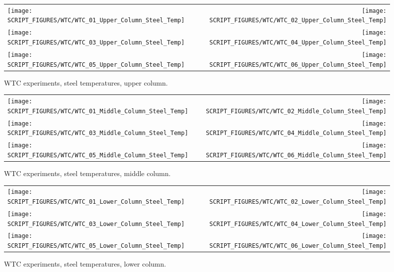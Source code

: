 \begin{figure}[p]
\begin{tabular*}{\textwidth}{l@{\extracolsep{\fill}}r}
\texttt{[image: SCRIPT\_FIGURES/WTC/WTC\_01\_Upper\_Column\_Steel\_Temp]} &
\texttt{[image: SCRIPT\_FIGURES/WTC/WTC\_02\_Upper\_Column\_Steel\_Temp]} \\
\texttt{[image: SCRIPT\_FIGURES/WTC/WTC\_03\_Upper\_Column\_Steel\_Temp]} &
\texttt{[image: SCRIPT\_FIGURES/WTC/WTC\_04\_Upper\_Column\_Steel\_Temp]} \\
\texttt{[image: SCRIPT\_FIGURES/WTC/WTC\_05\_Upper\_Column\_Steel\_Temp]} &
\texttt{[image: SCRIPT\_FIGURES/WTC/WTC\_06\_Upper\_Column\_Steel\_Temp]}
\end{tabular*}
\caption[WTC experiments, steel temperatures, upper column]{WTC experiments, steel temperatures, upper column.}
\label{NIST_WTC_Upper_Column_Steel}
\end{figure}

\begin{figure}[p]
\begin{tabular*}{\textwidth}{l@{\extracolsep{\fill}}r}
\texttt{[image: SCRIPT\_FIGURES/WTC/WTC\_01\_Middle\_Column\_Steel\_Temp]} &
\texttt{[image: SCRIPT\_FIGURES/WTC/WTC\_02\_Middle\_Column\_Steel\_Temp]} \\
\texttt{[image: SCRIPT\_FIGURES/WTC/WTC\_03\_Middle\_Column\_Steel\_Temp]} &
\texttt{[image: SCRIPT\_FIGURES/WTC/WTC\_04\_Middle\_Column\_Steel\_Temp]} \\
\texttt{[image: SCRIPT\_FIGURES/WTC/WTC\_05\_Middle\_Column\_Steel\_Temp]} &
\texttt{[image: SCRIPT\_FIGURES/WTC/WTC\_06\_Middle\_Column\_Steel\_Temp]}
\end{tabular*}
\caption[WTC experiments, steel temperatures, middle column]{WTC experiments, steel temperatures, middle column.}
\label{NIST_WTC_Middle_Column_Steel}
\end{figure}

\begin{figure}[p]
\begin{tabular*}{\textwidth}{l@{\extracolsep{\fill}}r}
\texttt{[image: SCRIPT\_FIGURES/WTC/WTC\_01\_Lower\_Column\_Steel\_Temp]} &
\texttt{[image: SCRIPT\_FIGURES/WTC/WTC\_02\_Lower\_Column\_Steel\_Temp]} \\
\texttt{[image: SCRIPT\_FIGURES/WTC/WTC\_03\_Lower\_Column\_Steel\_Temp]} &
\texttt{[image: SCRIPT\_FIGURES/WTC/WTC\_04\_Lower\_Column\_Steel\_Temp]} \\
\texttt{[image: SCRIPT\_FIGURES/WTC/WTC\_05\_Lower\_Column\_Steel\_Temp]} &
\texttt{[image: SCRIPT\_FIGURES/WTC/WTC\_06\_Lower\_Column\_Steel\_Temp]}
\end{tabular*}
\caption[WTC experiments, steel temperatures, lower column]{WTC experiments, steel temperatures, lower column.}
\label{NIST_WTC_Lower_Column_Steel}
\end{figure}

